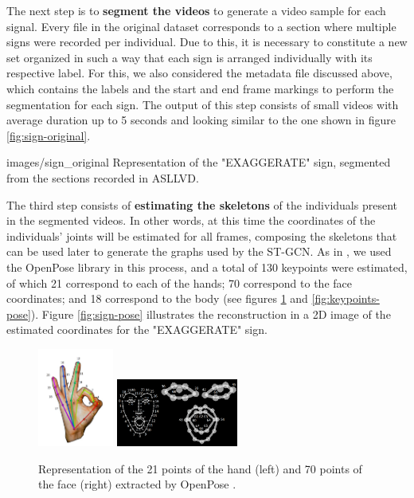 The next step is to \textbf{segment the videos} to generate a video sample for each signal. Every file in the original dataset corresponds to a section where multiple signs were recorded per individual. Due to this, it is necessary to constitute a new set organized in such a way that each sign is arranged individually with its respective label. For this, we also considered the metadata file discussed above, which contains the labels and the start and end frame markings to perform the segmentation for each sign. The output of this step consists of small videos with average duration up to 5 seconds and looking similar to the one shown in figure \ref{fig:sign-original}.

    {images/sign_original}
    {Representation of the "EXAGGERATE" sign, segmented from the sections recorded in ASLLVD.}

The third step consists of \textbf{estimating the skeletons} of the individuals present in the segmented videos. In other words, at this time the coordinates of the individuals' joints will be estimated for all frames, composing the skeletons that can be used later to generate the graphs used by the ST-GCN. As in \cite {st-gcn-2018}, we used the OpenPose library in this process, and a total of 130 keypoints were estimated, of which 21 correspond to each of the hands; 70 correspond to the face coordinates; and 18 correspond to the body (see figures \ref{fig:keypoints-face-hand} and \ref{fig:keypoints-pose}). Figure \ref{fig:sign-pose} illustrates the reconstruction in a 2D image of the estimated coordinates for the "EXAGGERATE" sign.

\begin{figure}[ht]
    \centering
    \includegraphics[width=2.5cm]{images/keypoints_hand}
    \includegraphics[width=4cm]{images/keypoints_face}
    \caption{Representation of the 21 points of the hand (left) and 70 points of the face (right) extracted by OpenPose \cite{openpose-output-2018}.}
    \label{fig:keypoints-face-hand}
\end{figure}

